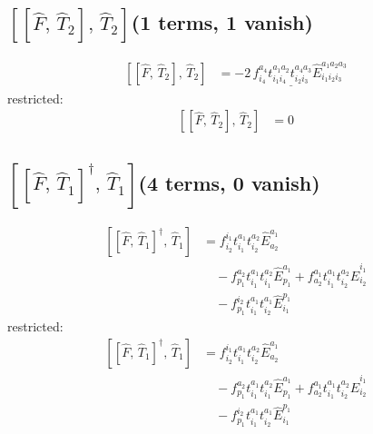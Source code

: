 \documentclass[11pt]{article}
\begin{document}
\subsection*{$\left[\left[\hat{F},\, \hat{T}_{2}\right],\, \hat{T}_{2}\right]$\quad(1 terms, 1 vanish)}
\begin{align}
\left[\left[\hat{F},\, \hat{T}_{2}\right],\, \hat{T}_{2}\right] &= \underline{- 2\, f^{a_{4}}_{i_{4}} t^{a_{1}a_{2}}_{i_{1}i_{4}} t^{a_{4}a_{3}}_{i_{2}i_{3}} \hat{E}^{a_{1}a_{2}a_{3}}_{i_{1}i_{2}i_{3}}}
\end{align}
restricted:
\begin{align}
\left[\left[\hat{F},\, \hat{T}_{2}\right],\, \hat{T}_{2}\right] &= 0
\end{align}
\subsection*{$\left[\left[\hat{F},\, \hat{T}_{1}\right]^{\dagger},\, \hat{T}_{1}\right]$\quad(4 terms, 0 vanish)}
\begin{align}
\left[\left[\hat{F},\, \hat{T}_{1}\right]^{\dagger},\, \hat{T}_{1}\right] &= f^{i_{1}}_{i_{2}} t^{a_{1}}_{i_{1}} t^{a_{2}}_{i_{2}} \hat{E}^{a_{1}}_{a_{2}} \\
&\quad - f^{a_{2}}_{p_{1}} t^{a_{1}}_{i_{1}} t^{a_{2}}_{i_{1}} \hat{E}^{a_{1}}_{p_{1}} + f^{a_{1}}_{a_{2}} t^{a_{1}}_{i_{1}} t^{a_{2}}_{i_{2}} \hat{E}^{i_{1}}_{i_{2}} \\
&\quad - f^{i_{2}}_{p_{1}} t^{a_{1}}_{i_{1}} t^{a_{1}}_{i_{2}} \hat{E}^{p_{1}}_{i_{1}}
\end{align}
restricted:
\begin{align}
\left[\left[\hat{F},\, \hat{T}_{1}\right]^{\dagger},\, \hat{T}_{1}\right] &= f^{i_{1}}_{i_{2}} t^{a_{1}}_{i_{1}} t^{a_{2}}_{i_{2}} \hat{E}^{a_{1}}_{a_{2}} \\
&\quad - f^{a_{2}}_{p_{1}} t^{a_{1}}_{i_{1}} t^{a_{2}}_{i_{1}} \hat{E}^{a_{1}}_{p_{1}} + f^{a_{1}}_{a_{2}} t^{a_{1}}_{i_{1}} t^{a_{2}}_{i_{2}} \hat{E}^{i_{1}}_{i_{2}} \\
&\quad - f^{i_{2}}_{p_{1}} t^{a_{1}}_{i_{1}} t^{a_{1}}_{i_{2}} \hat{E}^{p_{1}}_{i_{1}}
\end{align}
\end{document}
